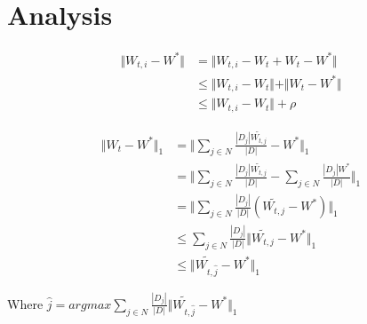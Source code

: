 \section{Analysis}

\newcommand{\wti}{W_{t,i}}
\newcommand{\wtj}{W_{t,j}}
\newcommand{\wt}{W_{t}}
\newcommand{\norm}[1]{\Vert #1 \Vert_{1}}


\begin{equation}
\begin{split}
	\Vert \wti - W^*\Vert & = \Vert \wti -\wt + \wt - W^*\Vert \\
                      & \leq \Vert \wti -\wt \Vert + \Vert \wt - W^* \Vert \\
                      & \leq \Vert \wti -\wt \Vert + \rho	
\end{split}
\end{equation}

\begin{equation}
\begin{split}
	\norm{\wt -W^*}  & = \norm{\sum_{j\in N} \frac{|D_j|\widetilde{\wtj}}{|D|} - W^*}  \\
	& = \norm{\sum_{j\in N} \frac{|D_j|\tilde{\wtj}}{|D|} - \sum_{j\in N} \frac{|D_j|W^*}{|D|}} \\
	& = \norm{ \sum_{j\in N} \frac{|D_j|}{|D|} ( \widetilde{\wtj} -W^* ) } \\
	& \leq \sum_{j\in N} \frac{|D_j|}{|D|} \norm{\widetilde{\wtj} -W^* } \\
	& \leq \norm{\widetilde{W_{t,\hat{j}} } - W^*}
\end{split}
\end{equation}

Where $\hat{j} = argmax \sum_{j\in N} \frac{|D_j|}{|D|} \norm{\widetilde{W_{t,\hat{j}} } - W^*}$ 



